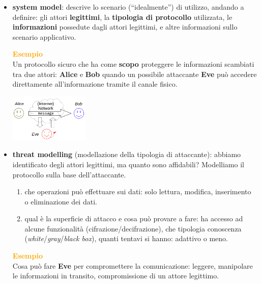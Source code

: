 \begin{itemize}[nosep]
    \item \textbf{system model}: descrive lo scenario (``idealmente'') di utilizzo, andando a definire: gli attori \textbf{legittimi}, la \textbf{tipologia di protocollo} utilizzata, le \textbf{informazioni} possedute dagli attori legittimi, e altre informazioni sullo scenario applicativo.
    \begin{boxA}
        \textcolor{orange}{\textbf{Esempio}} \\
        Un protocollo sicuro che ha come \textbf{scopo} proteggere le informazioni scambiati tra due attori: \textbf{Alice} e \textbf{Bob} quando un possibile attaccante \textbf{Eve} può accedere direttamente all'informazione tramite il canale fisico. 
        \smallskip

        {\centering
            \includegraphics[width=0.3\textwidth]{img/system_model.png}
        \par}
    \end{boxA}
    \item \textbf{threat modelling} (modellazione della tipologia di attaccante): abbiamo identificato degli attori legittimi, ma quanto sono affidabili? Modelliamo il protocollo sulla base dell'attaccante.
    \begin{enumerate}[nosep]
        \item che operazioni può effettuare sui dati: solo lettura, modifica, inserimento o eliminazione dei dati.
        \item qual è la superficie di attacco e cosa può provare a fare: ha accesso ad alcune funzionalità (cifrazione/decifrazione), che tipologia conoscenza (\textit{white}/\textit{gray}/\textit{black box}), quanti tentavi si hanno: adattivo o meno.
    \end{enumerate}
    \begin{boxA}
        \textcolor{orange}{\textbf{Esempio}} \\
        Cosa può fare \textbf{Eve} per compromettere la comunicazione: leggere, manipolare le informazioni in transito, compromissione di un attore legittimo.
        \smallskip


\end{boxA}
\end{itemize}
